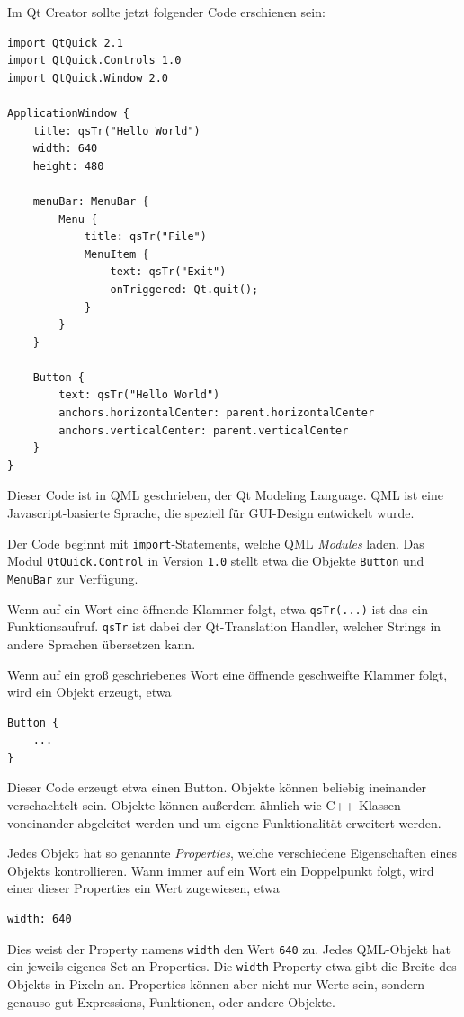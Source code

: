 \documentclass[a4paper]{article}
\begin{document}
Im Qt Creator sollte jetzt folgender Code erschienen sein:

\begin{verbatim}
import QtQuick 2.1
import QtQuick.Controls 1.0
import QtQuick.Window 2.0

ApplicationWindow {
    title: qsTr("Hello World")
    width: 640
    height: 480

    menuBar: MenuBar {
        Menu {
            title: qsTr("File")
            MenuItem {
                text: qsTr("Exit")
                onTriggered: Qt.quit();
            }
        }
    }

    Button {
        text: qsTr("Hello World")
        anchors.horizontalCenter: parent.horizontalCenter
        anchors.verticalCenter: parent.verticalCenter
    }
}
\end{verbatim}

Dieser Code ist in QML geschrieben, der Qt Modeling Language. QML ist eine Javascript-basierte Sprache, die speziell für GUI-Design entwickelt wurde.

Der Code beginnt mit \verb~import~-Statements, welche QML \emph{Modules} laden. Das Modul \verb~QtQuick.Control~ in Version \verb~1.0~ stellt etwa die Objekte \verb~Button~ und \verb~MenuBar~ zur Verfügung.

Wenn auf ein Wort eine öffnende Klammer folgt, etwa \verb~qsTr(...)~ ist das ein Funktionsaufruf. \verb~qsTr~ ist dabei der Qt-Translation Handler, welcher Strings in andere Sprachen übersetzen kann.

Wenn auf ein groß geschriebenes Wort eine öffnende geschweifte Klammer folgt, wird ein Objekt erzeugt, etwa

\begin{verbatim}
Button {
    ...
}
\end{verbatim}

Dieser Code erzeugt etwa einen Button. Objekte können beliebig ineinander verschachtelt sein. Objekte können außerdem ähnlich wie C++-Klassen voneinander abgeleitet werden und um eigene Funktionalität erweitert werden.

Jedes Objekt hat so genannte \emph{Properties}, welche verschiedene Eigenschaften eines Objekts kontrollieren. Wann immer auf ein Wort ein Doppelpunkt folgt, wird einer dieser Properties ein Wert zugewiesen, etwa

\begin{verbatim}
width: 640
\end{verbatim}

Dies weist der Property namens \verb~width~ den Wert \verb~640~ zu. Jedes QML-Objekt hat ein jeweils eigenes Set an Properties. Die \verb~width~-Property etwa gibt die Breite des Objekts in Pixeln an. Properties können aber nicht nur Werte sein, sondern genauso gut Expressions, Funktionen, oder andere Objekte.
\end{document}
